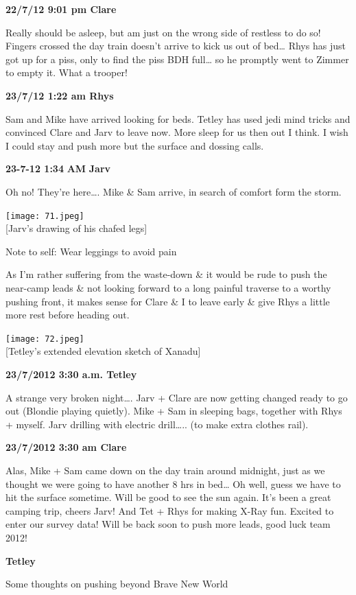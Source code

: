 \textbf{22/7/12 9:01 pm Clare}

Really should be asleep, but am just on the wrong side of restless to do
so! Fingers crossed the day train doesn't arrive to kick us out of
bed\ldots{} Rhys has just got up for a piss, only to find the piss BDH
full\ldots{} so he promptly went to Zimmer to empty it. What a trooper!

\textbf{23/7/12 1:22 am Rhys}

Sam and Mike have arrived looking for beds. Tetley has used jedi mind
tricks and convinced Clare and Jarv to leave now. More sleep for us then
out I think. I wish I could stay and push more but the surface and
dossing calls.

\textbf{23-7-12 1:34} \textbf{AM} \textbf{Jarv}

Oh no! They're here\ldots{}. Mike \& Sam arrive, in search of comfort
form the storm.

\texttt{[image: 71.jpeg]}\\
{[}Jarv's drawing of his chafed legs{]}

Note to self: Wear leggings to avoid pain

As I'm rather suffering from the waste-down \& it would be rude to push
the near-camp leads \& not looking forward to a long painful traverse to
a worthy pushing front, it makes sense for Clare \& I to leave early \&
give Rhys a little more rest before heading out.

\texttt{[image: 72.jpeg]}\\
{[}Tetley's extended elevation sketch of Xanadu{]}

\textbf{23/7/2012 3:30 a.m. Tetley}

A strange very broken night\ldots{}. Jarv + Clare are now getting
changed ready to go out (Blondie playing quietly). Mike + Sam in
sleeping bags, together with Rhys + myself. Jarv drilling with electric
drill\ldots{}.. (to make extra clothes rail).

\textbf{23/7/2012 3:30 am Clare}

Alas, Mike + Sam came down on the day train around midnight, just as we
thought we were going to have another 8 hrs in bed\ldots{} Oh well,
guess we have to hit the surface sometime. Will be good to see the sun
again. It's been a great camping trip, cheers Jarv! And Tet + Rhys for
making X-Ray fun. Excited to enter our survey data! Will be back soon to
push more leads, good luck team 2012!

\textbf{Tetley}

Some thoughts on pushing beyond Brave New World

